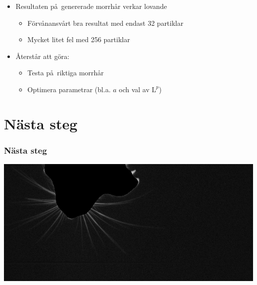 \documentclass[]{beamer}
\renewcommand{\ae}{\"{a}}
\renewcommand{\oe}{\"{o}}
\newcommand{\Lp}[1]{\mathrm{L}^{#1}}
\begin{document}
\begin{frame}
  \begin{itemize}
  \item Resultaten p\aa\ genererade morrh\aa r verkar lovande
    \begin{itemize}
      \item F\oe rv\aa nansv\aa rt bra resultat med endast 32 partiklar
      \item Mycket litet fel med 256 partiklar
      \end{itemize}
  \item \AA terst\aa r att g\oe ra:
    \begin{itemize}
    \item Testa p\aa\ riktiga morrh\aa r
    \item Optimera parametrar (bl.a. $a$ och val av $\Lp{p}$)
    \end{itemize}
  \end{itemize}
\end{frame}

\section{N\ae sta steg}
\begin{frame}
  \frametitle{N\ae sta steg}
  \includegraphics[width=1\textwidth]{preprocessing/frame-0759_whiskers.png}
\end{frame}
\end{document}
